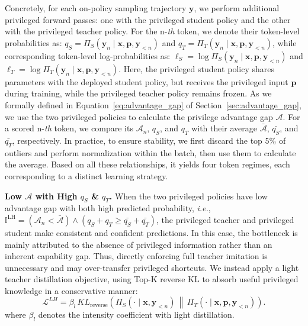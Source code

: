 \documentclass{llmxive}
\begin{document}
Concretely, for each on-policy sampling trajectory $\mathbf{y}$, we perform additional privileged forward passes: one with the privileged student policy and the other with the privileged teacher policy. For the n-\textit{th} token, we denote their token-level probabilities as: $q_{S}= \Pi_{S} \left( \mathbf{y}_{n} \mid \mathbf{x} , \mathbf{p}, \mathbf{y}_{<n} \right)$ and $ q_{T}= \Pi_{T} \left( \mathbf{y}_{n} \mid \mathbf{x} , \mathbf{p}, \mathbf{y}_{<n} \right)$, while corresponding token-level log-probabilities as:  $\ell_{S}= \log \Pi_{S} \left( \mathbf{y}_{n} \mid \mathbf{x} , \mathbf{p}, \mathbf{y}_{<n} \right)$ and $ \ell_{T}= \log \Pi_{T} \left( \mathbf{y}_{n} \mid \mathbf{x} , \mathbf{p}, \mathbf{y}_{<n} \right)$. 
Here, the privileged student policy shares parameters with the deployed student policy, but receives the privileged input $\mathbf{p}$ during training, while the privileged teacher policy remains frozen. As we formally defined in Equation~\ref{eq:advantage_gap} of Section~\ref{sec:advantage_gap}, we use the two privileged policies to calculate the privilege advantage gap $\mathcal{A}$. For a scored n-\textit{th} token, we compare its $\mathcal{A}_{n}$, $q_{S}$, and $q_{T}$  with their average $\bar{\mathcal{A}}$, $\bar{q_{S}}$, and $\bar{q_{T}}$, respectively. In practice, to ensure stability, we first discard the top 5\% of outliers and perform normalization within the batch, then use them to calculate the average. 
Based on all these relationships, it yields four token regimes, each corresponding to a distinct learning strategy.



\noindent\textbf{Low $\mathcal{A}$ with High $q_{S}$ \& $q_{T}$.}
When the two privileged policies have low advantage gap with both high predicted probability, \textit{i.e.}, $\mathbb{I}^{\mathrm{LH}}=\left(\mathcal{A}_{n}< \bar{\mathcal{A}}\right) \wedge \left(q_{S} + q_{T} \geq \bar{q_{S}} + \bar{q_{T}}\right)$, the privileged teacher and privileged student make consistent and confident predictions. 
In this case, the bottleneck is mainly attributed to the absence of privileged information rather than an inherent capability gap. 
Thus, directly enforcing full teacher imitation is unnecessary and may over-transfer privileged shortcuts. 
We instead apply a light teacher distillation objective, using Top-K reverse KL to absorb useful privileged knowledge in a conservative manner:
\begin{equation}
    \mathcal{L}^{LH}
    =
    \beta_{l}\,
    KL_{\mathrm{reverse}}
    \left(
        \Pi_{S}\left(\cdot\mid \mathbf{x},\mathbf{y}_{<n}\right)
        \,\middle\|\,
        \Pi_{T}\left(\cdot\mid \mathbf{x},\mathbf{p},\mathbf{y}_{<n}\right)
    \right).
\end{equation}
where $\beta_{l}$ denotes the intensity coefficient with light distillation.
\end{document}
